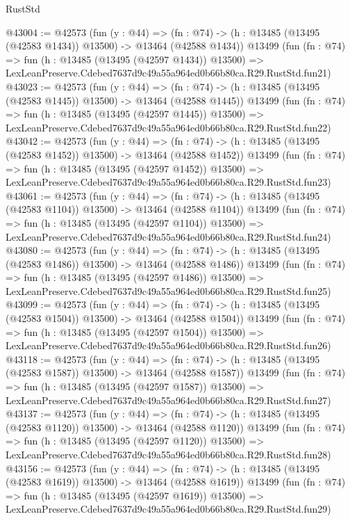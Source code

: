 \begin{lexlean}{RustStd}
\begin{coremodule}
@43004 := @42573
    (fun (y : @44) =>
    (fn : @74) -> (h : @13485 (@13495 (@42583 @1434)) @13500) -> @13464 (@42588 @1434))
    @13499
    (fun (fn : @74) =>
    fun (h : @13485 (@13495 (@42597 @1434)) @13500) =>
    LexLeanPreserve.Cdebed7637d9c49a55a964ed0b66b80ca.R29.RustStd.fun21)
@43023 := @42573
    (fun (y : @44) =>
    (fn : @74) -> (h : @13485 (@13495 (@42583 @1445)) @13500) -> @13464 (@42588 @1445))
    @13499
    (fun (fn : @74) =>
    fun (h : @13485 (@13495 (@42597 @1445)) @13500) =>
    LexLeanPreserve.Cdebed7637d9c49a55a964ed0b66b80ca.R29.RustStd.fun22)
@43042 := @42573
    (fun (y : @44) =>
    (fn : @74) -> (h : @13485 (@13495 (@42583 @1452)) @13500) -> @13464 (@42588 @1452))
    @13499
    (fun (fn : @74) =>
    fun (h : @13485 (@13495 (@42597 @1452)) @13500) =>
    LexLeanPreserve.Cdebed7637d9c49a55a964ed0b66b80ca.R29.RustStd.fun23)
@43061 := @42573
    (fun (y : @44) =>
    (fn : @74) -> (h : @13485 (@13495 (@42583 @1104)) @13500) -> @13464 (@42588 @1104))
    @13499
    (fun (fn : @74) =>
    fun (h : @13485 (@13495 (@42597 @1104)) @13500) =>
    LexLeanPreserve.Cdebed7637d9c49a55a964ed0b66b80ca.R29.RustStd.fun24)
@43080 := @42573
    (fun (y : @44) =>
    (fn : @74) -> (h : @13485 (@13495 (@42583 @1486)) @13500) -> @13464 (@42588 @1486))
    @13499
    (fun (fn : @74) =>
    fun (h : @13485 (@13495 (@42597 @1486)) @13500) =>
    LexLeanPreserve.Cdebed7637d9c49a55a964ed0b66b80ca.R29.RustStd.fun25)
@43099 := @42573
    (fun (y : @44) =>
    (fn : @74) -> (h : @13485 (@13495 (@42583 @1504)) @13500) -> @13464 (@42588 @1504))
    @13499
    (fun (fn : @74) =>
    fun (h : @13485 (@13495 (@42597 @1504)) @13500) =>
    LexLeanPreserve.Cdebed7637d9c49a55a964ed0b66b80ca.R29.RustStd.fun26)
@43118 := @42573
    (fun (y : @44) =>
    (fn : @74) -> (h : @13485 (@13495 (@42583 @1587)) @13500) -> @13464 (@42588 @1587))
    @13499
    (fun (fn : @74) =>
    fun (h : @13485 (@13495 (@42597 @1587)) @13500) =>
    LexLeanPreserve.Cdebed7637d9c49a55a964ed0b66b80ca.R29.RustStd.fun27)
@43137 := @42573
    (fun (y : @44) =>
    (fn : @74) -> (h : @13485 (@13495 (@42583 @1120)) @13500) -> @13464 (@42588 @1120))
    @13499
    (fun (fn : @74) =>
    fun (h : @13485 (@13495 (@42597 @1120)) @13500) =>
    LexLeanPreserve.Cdebed7637d9c49a55a964ed0b66b80ca.R29.RustStd.fun28)
@43156 := @42573
    (fun (y : @44) =>
    (fn : @74) -> (h : @13485 (@13495 (@42583 @1619)) @13500) -> @13464 (@42588 @1619))
    @13499
    (fun (fn : @74) =>
    fun (h : @13485 (@13495 (@42597 @1619)) @13500) =>
    LexLeanPreserve.Cdebed7637d9c49a55a964ed0b66b80ca.R29.RustStd.fun29)

\end{coremodule}
\end{lexlean}
